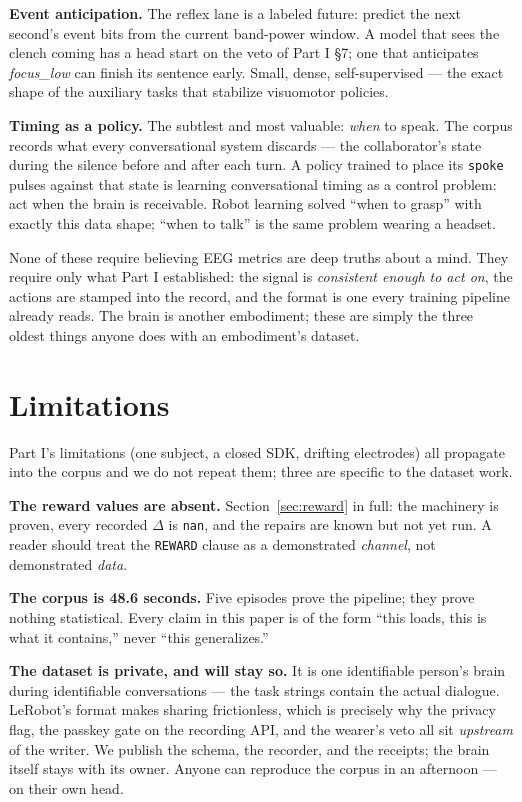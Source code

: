 \documentclass{article}
\begin{document}
\textbf{Event anticipation.} The reflex lane is a labeled future: predict the next second's event bits from the current band-power window. A model that sees the clench coming has a head start on the veto of Part I \S7; one that anticipates \emph{focus\_low} can finish its sentence early. Small, dense, self-supervised --- the exact shape of the auxiliary tasks that stabilize visuomotor policies.

\textbf{Timing as a policy.} The subtlest and most valuable: \emph{when} to speak. The corpus records what every conversational system discards --- the collaborator's state during the silence before and after each turn. A policy trained to place its \texttt{spoke} pulses against that state is learning conversational timing as a control problem: act when the brain is receivable. Robot learning solved ``when to grasp'' with exactly this data shape; ``when to talk'' is the same problem wearing a headset.

None of these require believing EEG metrics are deep truths about a mind. They require only what Part I established: the signal is \emph{consistent enough to act on}, the actions are stamped into the record, and the format is one every training pipeline already reads. The brain is another embodiment; these are simply the three oldest things anyone does with an embodiment's dataset.

\section{Limitations}
\label{sec:limits2}

Part I's limitations (one subject, a closed SDK, drifting electrodes) all propagate into the corpus and we do not repeat them; three are specific to the dataset work.

\textbf{The reward values are absent.} Section~\ref{sec:reward} in full: the machinery is proven, every recorded $\Delta$ is \texttt{nan}, and the repairs are known but not yet run. A reader should treat the \texttt{REWARD} clause as a demonstrated \emph{channel}, not demonstrated \emph{data}.

\textbf{The corpus is 48.6 seconds.} Five episodes prove the pipeline; they prove nothing statistical. Every claim in this paper is of the form ``this loads, this is what it contains,'' never ``this generalizes.''

\textbf{The dataset is private, and will stay so.} It is one identifiable person's brain during identifiable conversations --- the task strings contain the actual dialogue. LeRobot's format makes sharing frictionless, which is precisely why the privacy flag, the passkey gate on the recording API, and the wearer's veto all sit \emph{upstream} of the writer. We publish the schema, the recorder, and the receipts; the brain itself stays with its owner. Anyone can reproduce the corpus in an afternoon --- on their own head.
\end{document}

